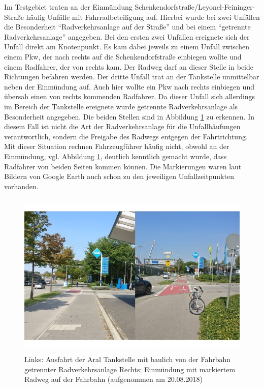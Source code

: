 Im Testgebiet traten an der Einmündung Schenkendorfstraße/Leyonel-Feininger-Straße häufig Unfälle mit Fahrradbeteiligung auf. Hierbei wurde bei zwei Unfällen die Besonderheit \enquote{Radverkehrsanlage auf der Straße} und bei einem \enquote{getrennte Radverkehrsanlage} angegeben. Bei den ersten zwei Unfällen ereignete sich der Unfall direkt am Knotenpunkt. Es kam dabei jeweils zu einem Unfall zwischen einem Pkw, der nach rechts auf die Schenkendorfstraße einbiegen wollte und einem Radfahrer, der von rechts kam. Der Radweg darf an dieser Stelle in beide Richtungen befahren werden. Der dritte Unfall trat an der Tankstelle unmittelbar neben der Einmündung auf. Auch hier wollte ein Pkw nach rechts einbiegen und übersah einen von rechts kommenden Radfahrer. Da dieser Unfall sich allerdings im Bereich der Tankstelle ereignete wurde getrennte Radverkehrsanlage als Besonderheit angegeben. Die beiden Stellen sind in Abbildung \ref{fig:Lyonel-Feininger} zu erkennen. In diesem Fall ist nicht die Art der Radverkehrsanlage für die Unfallhäufungen verantwortlich, sondern die Freigabe des Radwegs entgegen der Fahrtrichtung. Mit dieser Situation rechnen Fahrzeugführer häufig nicht, obwohl an der Einmündung, vgl. Abbildung \ref{fig:Lyonel-Feininger}, deutlich kenntlich gemacht wurde, dass Radfahrer von beiden Seiten kommen können. Die Markierungen waren laut Bildern von Google Earth auch schon zu den jeweiligen Unfallzeitpunkten vorhanden.

\begin{savenotes}
	\begin{figure}[H]
		\centering
		\includegraphics[width=12cm,height=8cm]{figures/Lyonel_Feininger}
		\caption[Ausfahrt Aral Tankstelle und Einmündung Lyonel-Feininger-Straße]{Links: Ausfahrt der Aral Tankstelle mit baulich von der Fahrbahn getrennter Radverkehrsanlage Rechts: Einmündung mit markiertem Radweg auf der Fahrbahn (aufgenommen am 20.08.2018)}\label{fig:Lyonel-Feininger}
	\end{figure}
\end{savenotes}

